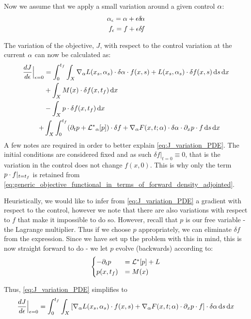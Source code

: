 Now we assume that we apply a small variation around a given control $\alpha$: 
\begin{align*}
\alpha_{\epsilon} = \alpha + {\epsilon} { \delta\! \alpha}
\\
f_{\epsilon} = f + {\epsilon} { \delta\! f}
\end{align*}

The variation of the objective, $J$, with respect to the control
variation at the current $\alpha$ can now be calculated as:
\begin{align}
\frac {dJ}{d{\epsilon}} \Big|_{{\epsilon} = 0} &= 
\int_0^{ t_f }\int_X { \nabla }_\alpha L(x_s, \alpha_s) \cdot \delta \alpha \cdot f(x,s) +
L(x_s, \alpha_s) \cdot \delta f(x,s)
\, \mathrm{d} s\, \mathrm{d} x 
\notag \\
&+ 
\int_X  M(x)\cdot \delta f(x,{ t_f }) \, \mathrm{d} x \notag
\\ &- 
\int_X    p\cdot \delta f(x, { t_f })     \, \mathrm{d} x  \notag \\+& 
    \int_X \int_0^{ t_f }  ({\partial}_t p  + { { \mathcal{L} }^* }_{\alpha} [p]) \cdot \delta f 
    + { \nabla }_\alpha F(x,t;\alpha) \cdot \delta \alpha \cdot  {\partial}_xp \cdot f 
     \, \mathrm{d} s
    \, \mathrm{d} x
\label{eq:J_variation_PDE}
\end{align}
A few notes are required in order to better explain \cref{eq:J_variation_PDE}.
The initial conditions are considered fixed and as such $\delta f |_{t=0} \equiv
0 $, that is the variation in the control does not change $f(x, 0)$. This is
why only the term $p\cdot f|_{t={ t_f }}$ is retained from \cref{eq:generic_objective_functional_in_terms_of_forward_density_adjointed}.

Heuristically, we would like to infer from \cref{eq:J_variation_PDE} a gradient
with respect to the control, however we note that there are also variations with
respect to $f$ that make it impossible to do so. However, recall that $p$ is
our free variable - the Lagrange multiplier. Thus if we choose $p$
appropriately, we can eliminate $\delta f$ from the expression. Since we
have set up the problem with this in mind, this is now straight forward
to do - we let $p$ evolve (backwards) according to:
\begin{equation}
\begin{cases}
-{\partial}_t p &= { { \mathcal{L} }^* }[p] + L
\\
p(x, { t_f }) &=  M(x)  
\end{cases}
\label{eq:generic_adjoint_PDE}
\end{equation}

Thus, \cref{eq:J_variation_PDE} simplifies to
\begin{equation}
\frac {dJ}{d{\epsilon}} \Big|_{{\epsilon} = 0} =
\int_0^{ t_f }\int_X \left[ { \nabla }_\alpha L(x_s, \alpha_s) \cdot f(x,s) +
 { \nabla }_\alpha F(x,t;\alpha) \cdot {\partial}_xp \cdot f \right] \cdot \delta \alpha
     \, \mathrm{d} s    \, \mathrm{d} x
\label{eq:J_variation_PDE_simplified}
\end{equation}

